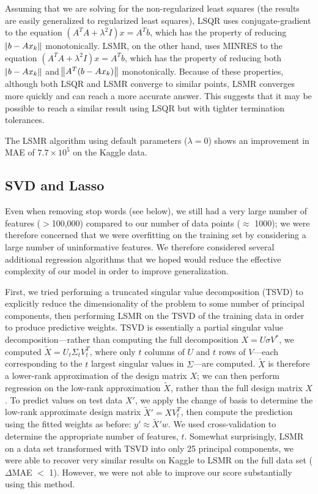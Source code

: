 \documentclass[11pt]{amsart}
\begin{document}
Assuming that we are solving for the non-regularized least squares (the results are easily generalized to regularized least squares), LSQR uses conjugate-gradient to the equation $(A^TA+\lambda^2I)x=A^Tb$, which has the property of reducing $\norm{b-Ax_k}$ monotonically. LSMR, on the other hand, uses MINRES to the equation $(A^TA+\lambda^2I)x=A^Tb$, which has the property of reducing both $\norm{b-Ax_k}$ and $\norm{A^T(b-Ax_k)}$ monotonically. Because of these properties, although both LSQR and LSMR converge to similar points, LSMR converges more quickly and can reach a more accurate answer. This suggests that it may be possible to reach a similar result using LSQR but with tighter termination tolerances.

The LSMR algorithm using default parameters ($\lambda=0$) shows an improvement in MAE of $7.7\times10^5$ on the Kaggle data.

\subsection{SVD and Lasso}

Even when removing stop words (see below), we still had a very large number of features ($>$100,000) compared to our number of data points ($\approx$ 1000); we were therefore concerned that we were overfitting on the training set by considering a large number of uninformative features.  We therefore considered several additional regression algorithms that we hoped would reduce the effective complexity of our model in order to improve generalization. 

First, we tried performing a truncated singular value decomposition (TSVD) to explicitly reduce the dimensionality of the problem to some number of principal components, then performing LSMR on the TSVD of the training data in order to produce predictive weights. TSVD is essentially a partial singular value decomposition---rather than computing the full decomposition $X = U \sigma V^*$, we computed $\tilde{X} = U_t \Sigma_t V_t^T$, where only $t$ columns of $U$ and $t$ rows of $V$---each corresponding to the $t$ largest singular values in $\Sigma$---are computed. $\tilde{X}$ is therefore a lower-rank approximation of the design matrix $X$; we can then perform regression on the low-rank approximation $\tilde{X}$, rather than the full design matrix $X$. To predict values on test data $X'$, we apply the change of basis to determine the low-rank approximate design matrix $\tilde{X}' = XV_t^T$, then compute the prediction using the fitted weights as before: $y' \approx \tilde{X}' w$. We used cross-validation to determine the appropriate number of features, $t$. Somewhat surprisingly, LSMR on a data set transformed with TSVD into only 25 principal components, we were able to recover very similar results on Kaggle to LSMR on the full data set ($\Delta$MAE $<$ 1). However, we were not able to improve our score substantially using this method.
\end{document}
